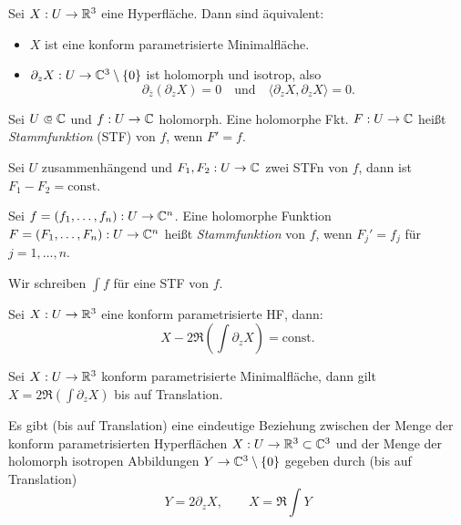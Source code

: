 \documentclass{cheat-sheet}
\begin{document}
\begin{lem}
  Sei $X : U \to \mathbb{R}^3$ eine Hyperfläche. Dann sind äquivalent:
  \begin{itemize}
    \item $X$ ist eine konform parametrisierte Minimalfläche.
    \item $\partial_z X : U \to \mathbb{C}^3 \setminus \{ 0 \}$ ist holomorph und isotrop, also
    \[
      \partial_{\overline{z}} (\partial_z X) = 0
      \quad \text{und} \quad
      \langle \partial_z X, \partial_z X \rangle = 0.
    \]
  \end{itemize}
\end{lem}


\begin{defn}
  Sei $U \opn \C$ und $f : U \to \mathbb{C}$ holomorph. Eine holomorphe Fkt. $F : U \to \mathbb{C}$ heißt \emph{Stammfunktion} (STF) von $f$, wenn $F' = f$.
\end{defn}

\begin{bem}
  Sei $U$ zusammenhängend und $F_1, F_2 : U \to \mathbb{C}$ zwei STFn von $f$, dann ist $F_1 - F_2 = \mathrm{const}$.
\end{bem}

\begin{defn}
  Sei $f = (f_1, \ldots, f_n) : U \to \mathbb{C}^n$. Eine holomorphe Funktion $F = (F_1, \ldots, F_n) : U \to \mathbb{C}^n$ heißt \emph{Stammfunktion} von $f$, wenn $F_j' = f_j$ für $j = 1, \ldots, n$.
\end{defn}

\begin{nota}
  Wir schreiben ${\textstyle \int} f$ für eine STF von $f$.
\end{nota}

\begin{lem}
  Sei $X : U \to \mathbb{R}^3$ eine konform parametrisierte HF, dann:
  \[ X - 2 \Re \left( {\textstyle \int} \partial_z X \right) = \mathrm{const}. \]
\end{lem}

\begin{bem}
  Sei $X : U \to \mathbb{R}^3$ konform parametrisierte Minimalfläche, dann gilt $X = 2 \Re \left( {\textstyle \int} \partial_z X \right)$ bis auf Translation.
\end{bem}

\begin{satz}
  Es gibt (bis auf Translation) eine eindeutige Beziehung zwischen der Menge der konform parametrisierten Hyperflächen $X : U \to \mathbb{R}^3 \subset \mathbb{C}^3$ und der Menge der holomorph isotropen Abbildungen $Y \to \mathbb{C}^3 \setminus \{ 0 \}$ gegeben durch (bis auf Translation)
  \[ Y = 2 \partial_z X, \qquad X = \Re {\textstyle \int} Y \]
\end{satz}
\end{document}
